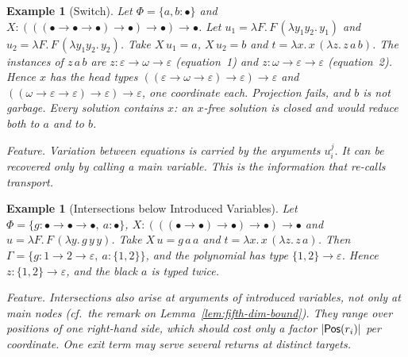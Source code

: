 \documentclass[10pt,a4paper]{article}
\theoremstyle{plain}%
\newtheorem{example}[theorem]{Example}
\begin{document}
\begin{example}[Switch]\label{ex:ex-switch}
Let $\Phi = \{a,b : \bullet\}$ and $X : (((\bullet\to\bullet\to\bullet)\to\bullet)\to\bullet)\to\bullet$.
Let $u_1 = \lambda F.\,F\,(\lambda y_1y_2.\,y_1)$ and $u_2 = \lambda F.\,F\,(\lambda y_1y_2.\,y_2)$.
Take $X\,u_1 = a$, $X\,u_2 = b$ and $t = \lambda x.\,x\,(\lambda z.\,z\,a\,b)$.
The instances of $z\,a\,b$ are $z : \varepsilon \to \omega \to \varepsilon$ (equation~1) and $z : \omega \to \varepsilon \to \varepsilon$ (equation~2).
Hence $x$ has the head types $((\varepsilon \to \omega \to \varepsilon) \to \varepsilon) \to \varepsilon$ and $((\omega \to \varepsilon \to \varepsilon) \to \varepsilon) \to \varepsilon$, one coordinate each.
Projection fails, and $b$ is not garbage.
Every solution contains $x$: an $x$-free solution is closed and would reduce both to $a$ and to $b$.

\emph{Feature.}
Variation between equations is carried by the arguments $u_i^j$.
It can be recovered only by calling a main variable.
This is the information that re-calls transport.
\end{example}

\begin{example}[Intersections below Introduced Variables]\label{ex:ex-pos}
Let $\Phi = \{g : \bullet\to\bullet\to\bullet,\ a : \bullet\}$, $X : (((\bullet\to\bullet)\to\bullet)\to\bullet)\to\bullet$ and $u = \lambda F.\,F\,(\lambda y.\,g\,y\,y)$.
Take $X\,u = g\,a\,a$ and $t = \lambda x.\,x\,(\lambda z.\,z\,a)$.
Then $\Gamma = \{g : 1 \to 2 \to \varepsilon,\ a : \{1,2\}\}$, and the polynomial has type $\{1,2\} \to \varepsilon$.
Hence $z : \{1,2\} \to \varepsilon$, and the black $a$ is typed twice.

\emph{Feature.}
Intersections also arise at arguments of introduced variables, not only at main nodes (cf.\ the remark on Lemma~\ref{lem:fifth-dim-bound}).
They range over positions of one right-hand side, which should cost only a factor $|\mathsf{Pos}(r_i)|$ per coordinate.
One exit term may serve several returns at distinct targets.
\end{example}
\end{document}
